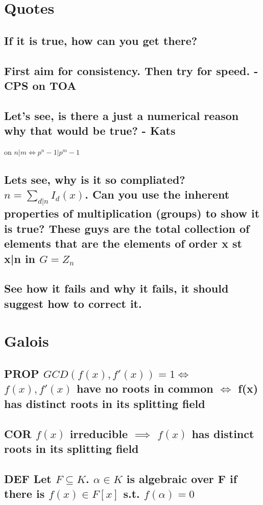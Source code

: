 \documentclass[11pt]{article}
\author{ychnh}
\date{\today}
\title{}
\begin{document}
\section{Quotes}
\label{sec:org6c1edcb}
\subsection{If it is true, how can you get there?}
\label{sec:orgbe2f326}
\subsection{First aim for consistency. Then try for speed. - CPS on TOA}
\label{sec:orgd167be9}
\subsection{Let's see, is there a just a numerical reason why that would be true? - Kats}
\label{sec:orgfc57ed0}
on \(n|m \iff p^n-1 | p^m-1\)
\subsection{Lets see, why is it so compliated? \(n = \sum_{d|n} I_d(x)\). Can you use the inherent properties of multiplication (groups) to show it is true? These guys are the total collection of elements that are the elements of order x st x|n in \(G=Z_n\)}
\label{sec:orgdd36cd8}
\subsection{See how it fails and why it fails, it should suggest how to correct it.}
\label{sec:org50238ce}

\section{Galois}
\label{sec:org6140f42}
\subsection{\textbf{PROP} \(GCD(f(x), f'(x) )=1 \iff\) \(f(x), f'(x)\) have no roots in common \(\iff\) f(x) has distinct roots in its splitting field}
\label{sec:orgcd95308}
\subsection{\textbf{COR} \(f(x)\) irreducible \(\implies\) \(f(x)\) has distinct roots in its splitting field}
\label{sec:org7bebe0d}
\subsection{\textbf{DEF} Let \(F \subseteq K\). \(\alpha \in K\) is \textbf{algebraic} over F if there is \(f(x)\in F[x]\) s.t. \(f(\alpha)=0\)}
\label{sec:org7a4899c}
\end{document}
